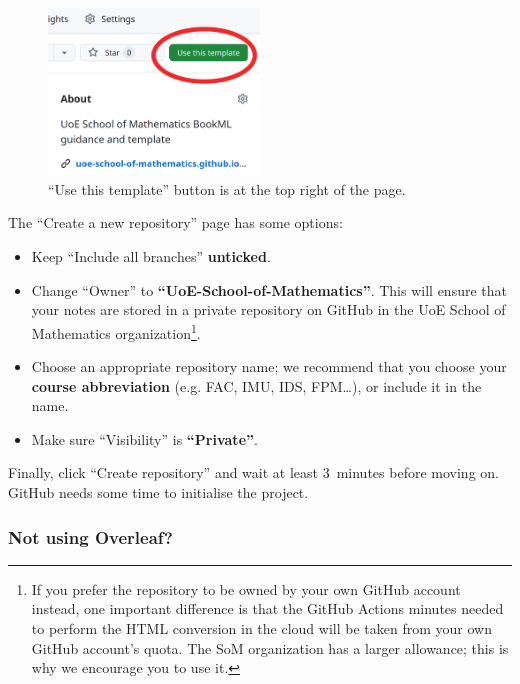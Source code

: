 \begin{figure}[h]
    \centering
    \includegraphics[width=0.5\textwidth]{img/use_template.png}
    \caption{``Use this template'' button is at the top right of the page.}
    \label{fig:use-template}
\end{figure}

The ``Create a new repository'' page has some options:

\begin{itemize}
    \item Keep ``Include all branches'' \textbf{unticked}.
    \item Change ``Owner'' to \textbf{``UoE-School-of-Mathematics''}. This will ensure that your notes are stored in a private repository on GitHub in the UoE School of Mathematics organization\footnote{If you prefer the repository to be owned by your own GitHub account instead, one important difference is that the GitHub Actions minutes needed to perform the HTML conversion in the cloud will be taken from your own GitHub account's quota. The SoM organization has a larger allowance; this is why we encourage you to use it.}.
    \item Choose an appropriate repository name; we recommend that you choose your \textbf{course abbreviation} (e.g. FAC, IMU, IDS, FPM\ldots), or include it in the name.
    \item Make sure ``Visibility'' is \textbf{``Private''}.
\end{itemize}

Finally, click ``Create repository'' and wait at least 3~minutes before moving on. GitHub needs some time to initialise the project.

\subsubsection{Not using Overleaf?}

